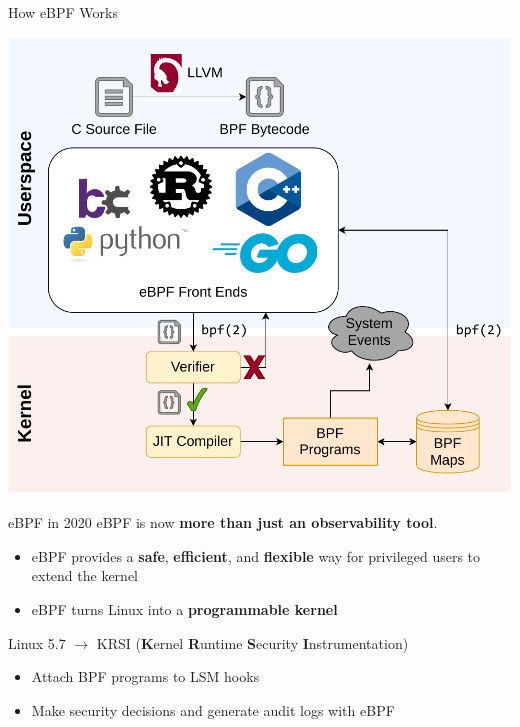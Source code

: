 \documentclass[12pt, dvipsnames, aspectratio=169]{beamer}
\begin{document}
\begin{frame}[c]{How eBPF Works}
\begin{center}
    \color{black}
    \includegraphics[height=0.8\textheight]{figs/how-ebpf-works.pdf}
\end{center}
\end{frame}

\begin{frame}[c]{eBPF in 2020}
eBPF is now \textbf{more than just an observability tool}.
\begin{itemize}
    \item eBPF provides a \textbf{safe}, \textbf{efficient}, and \textbf{flexible} way for privileged users to extend the kernel
    \item eBPF turns Linux into a \textbf{programmable kernel}
\end{itemize}
\vfill
Linux 5.7 $\rightarrow$ KRSI (\textbf{K}ernel \textbf{R}untime \textbf{S}ecurity \textbf{I}nstrumentation)
\begin{itemize}
    \item Attach BPF programs to LSM hooks
    \item Make security decisions and generate audit logs with eBPF
\end{itemize}
\end{frame}

\end{document}
